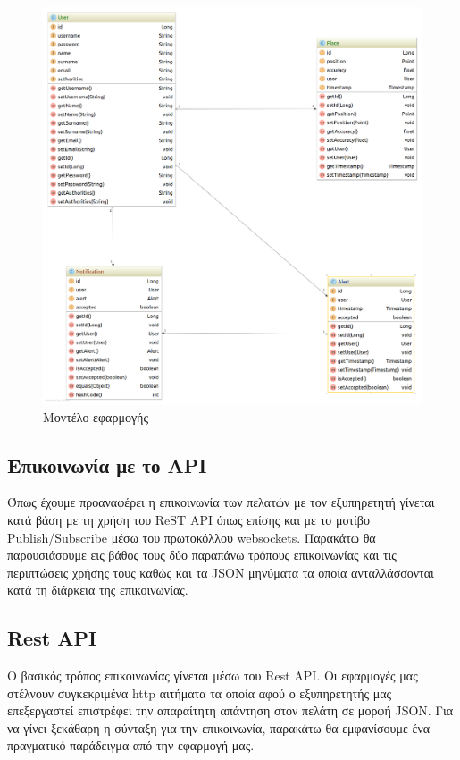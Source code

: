 \begin{figure}[h]
  \centering
  \includegraphics[width=150mm]{images/domain-diagram.png}
  \caption{Μοντέλο εφαρμογής}
  \label{fig:domain-diagram}
\end{figure}

\newpage

\subsection{Επικοινωνία με το API}
Όπως έχουμε προαναφέρει η επικοινωνία των πελατών με τον εξυπηρετητή γίνεται κατά βάση με τη χρήση του ReST API όπως επίσης και με το μοτίβο Publish/Subscribe μέσω του πρωτοκόλλου websockets. Παρακάτω θα παρουσιάσουμε εις βάθος τους δύο παραπάνω τρόπους επικοινωνίας και τις περιπτώσεις χρήσης τους καθώς και τα JSON μηνύματα τα οποία ανταλλάσσονται κατά τη διάρκεια της επικοινωνίας.

\subsection{Rest API}
Ο βασικός τρόπος επικοινωνίας γίνεται μέσω του Rest API. Οι εφαρμογές μας στέλνουν συγκεκριμένα http αιτήματα τα οποία αφού ο εξυπηρετητής μας επεξεργαστεί επιστρέφει την απαραίτητη απάντηση στον πελάτη σε μορφή JSON. Για να γίνει ξεκάθαρη η σύνταξη για την επικοινωνία, παρακάτω θα εμφανίσουμε ένα πραγματικό παράδειγμα από την εφαρμογή μας. 

